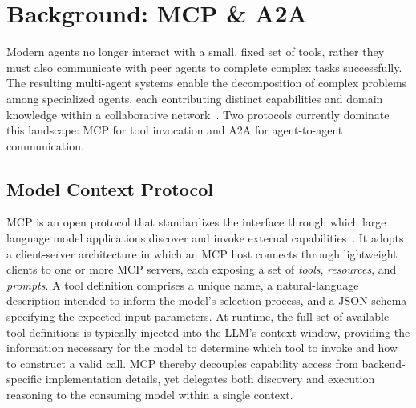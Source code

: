 \section{Background: MCP \& A2A}

Modern agents no longer interact with a small, fixed set of tools, rather they must also communicate with peer agents to complete complex tasks successfully. The resulting multi-agent systems enable the decomposition of complex problems among specialized agents, each contributing distinct capabilities and domain knowledge within a collaborative network~\cite{krishnan2025advancingmas}. Two protocols currently dominate this landscape: MCP for tool invocation and A2A for agent-to-agent communication.

\subsection{Model Context Protocol}
MCP is an open protocol that standardizes the interface through which large language model applications discover and invoke external capabilities~\cite{mcp2024introduction}. It adopts a client-server architecture in which an MCP host connects through lightweight clients to one or more MCP servers, each exposing a set of \emph{tools}, \emph{resources}, and \emph{prompts}. A tool definition comprises a unique name, a natural-language description intended to inform the model's selection process, and a JSON schema specifying the expected input parameters. At runtime, the full set of available tool definitions is typically injected into the LLM's context window, providing the information necessary for the model to determine which tool to invoke and how to construct a valid call. MCP thereby decouples capability access from backend-specific implementation details, yet delegates both discovery and execution reasoning to the consuming model within a single context.

